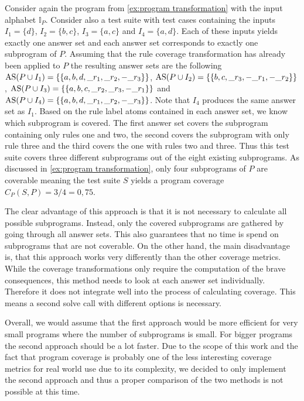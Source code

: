\begin{example}
\label{ex:program coverage calculation}
    Consider again the program from \cref{ex:program transformation} with the input alphabet $\mathbb{I}_P$. Consider also a test suite with test cases containing the inputs \(I_1 = \{d\}\), \(I_2 = \{b, c\}\), \(I_3 = \{a, c\}\) and \(I_4 = \{a, d\}\). Each of these inputs yields exactly one answer set and each answer set corresponds to exactly one subprogram of $P$. Assuming that the rule coverage transformation has already been applied to $P$ the resulting answer sets are the following \(\operatorname{AS}(P \cup I_1) = \{\{a, b, d, \_r_1, \_r_2, -\_r_3\}\}\), \(\operatorname{AS}(P \cup I_2) = \{\{b, c, \_r_3, -\_r_1, -\_r_2\}\}\), \(\operatorname{AS}(P \cup I_3) = \{\{a, b, c, \_r_2, \_r_3, -\_r_1\}\}\) and \(\operatorname{AS}(P \cup I_4) = \{\{a, b, d, \_r_1, \_r_2, -\_r_3\}\}\). Note that $I_4$ produces the same answer set as $I_1$. Based on the rule label atoms contained in each answer set, we know which subprogram is covered. The first answer set covers the subprogram containing only rules one and two, the second covers the subprogram with only rule three and the third covers the one with rules two and three. Thus this test suite covers three different subprograms out of the eight existing subprograms. As discussed in \cref{ex:program transformation}, only four subprograms of $P$ are coverable meaning the test suite $S$ yields a program coverage \(C_P(S, P) = 3 / 4 = 0,75\).
\end{example}

The clear advantage of this approach is that it is not necessary to calculate all possible subprograms. Instead, only the covered subprograms are gathered by going through all answer sets. This also guarantees that no time is spend on subprograms that are not coverable. On the other hand, the main disadvantage is, that this approach works very differently than the other coverage metrics. While the coverage transformations only require the computation of the brave consequences, this method needs to look at each answer set individually. Therefore it does not integrate well into the process of calculating coverage. This means a second solve call with different options is necessary. 

Overall, we would assume that the first approach would be more efficient for very small programs where the number of subprograms is small. For bigger programs the second approach should be a lot faster. Due to the scope of this work and the fact that program coverage is probably one of the less interesting coverage metrics for real world use due to its complexity, we decided to only implement the second approach and thus a proper comparison of the two methods is not possible at this time.

